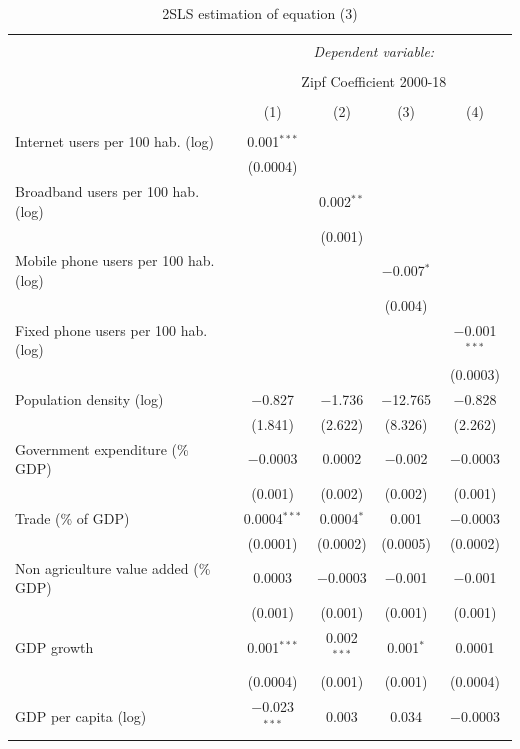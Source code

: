 \documentclass[10pt,letterpaper]{article}
\begin{document}
\begin{table}[!htbp] \centering 
  \caption{2SLS estimation of equation (3)\label{2sls.global}} 
  \label{} 
\small 
\begin{tabular}{@{\extracolsep{1pt}}lcccc} 
\\[-1.8ex]\hline 
\hline \\[-1.8ex] 
 & \multicolumn{4}{c}{\textit{Dependent variable:}} \\ 
\cline{2-5} 
\\[-1.8ex] & \multicolumn{4}{c}{Zipf Coefficient 2000-18} \\ 
\\[-1.8ex] & (1) & (2) & (3) & (4)\\ 
\hline \\[-1.8ex] 
 Internet users per 100 hab. (log) & 0.001$^{***}$ &  &  &  \\ 
  & (0.0004) &  &  &  \\ 
  Broadband users per 100 hab. (log) &  & 0.002$^{**}$ &  &  \\ 
  &  & (0.001) &  &  \\ 
  Mobile phone users per 100 hab. (log) &  &  & $-$0.007$^{*}$ &  \\ 
  &  &  & (0.004) &  \\ 
  Fixed phone users per 100 hab. (log) &  &  &  & $-$0.001$^{***}$ \\ 
  &  &  &  & (0.0003) \\ 
  Population density (log) & $-$0.827 & $-$1.736 & $-$12.765 & $-$0.828 \\ 
  & (1.841) & (2.622) & (8.326) & (2.262) \\ 
  Government expenditure (\% GDP) & $-$0.0003 & 0.0002 & $-$0.002 & $-$0.0003 \\ 
  & (0.001) & (0.002) & (0.002) & (0.001) \\ 
  Trade (\% of GDP) & 0.0004$^{***}$ & 0.0004$^{*}$ & 0.001 & $-$0.0003 \\ 
  & (0.0001) & (0.0002) & (0.0005) & (0.0002) \\ 
  Non agriculture value added (\% GDP) & 0.0003 & $-$0.0003 & $-$0.001 & $-$0.001 \\ 
  & (0.001) & (0.001) & (0.001) & (0.001) \\ 
  GDP growth & 0.001$^{***}$ & 0.002$^{***}$ & 0.001$^{*}$ & 0.0001 \\ 
  & (0.0004) & (0.001) & (0.001) & (0.0004) \\ 
  GDP per capita (log) & $-$0.023$^{***}$ & 0.003 & 0.034 & $-$0.0003 \\ 

\end{tabular}
\end{table}
\end{document}

